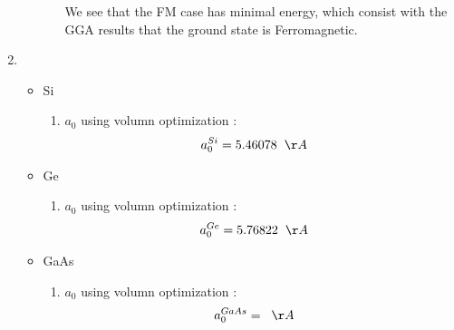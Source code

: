 \documentclass[notitlepage]{revtex4-1}
\begin{document}
\begin{CJK}{UTF8}{bsmi}
\begin{enumerate}
\begin{itemize}
\begin{enumerate}[label=(\arabic*)]
					We see that the FM case has minimal energy, which consist with the GGA results that the ground state is Ferromagnetic. 
					 
					
				\end{enumerate}
		\end{itemize}
	\item 
	\begin{itemize}
		\item Si
		\begin{enumerate}[label=(\arabic*)]
			\item $a_0$ using volumn optimization :
			\begin{align*}
			a^{Si}_0 &= 5.46078 \hspace{0.2cm} \AA 
			\end{align*} 
		\end{enumerate}
	
		\item Ge
		\begin{enumerate}[label=(\arabic*)]
			\item $a_0$ using volumn optimization :
			\begin{align*}
			a^{Ge}_0 &= 5.76822 \hspace{0.2cm} \AA 
			\end{align*} 
		\end{enumerate}
	
		\item GaAs
		\begin{enumerate}[label=(\arabic*)]
			\item $a_0$ using volumn optimization :
			\begin{align*}
			a^{GaAs}_0 &=  \hspace{0.2cm} \AA 
			\end{align*} 
		\end{enumerate}		
	\end{itemize}
\end{enumerate}





	
\end{CJK}
\end{document}

